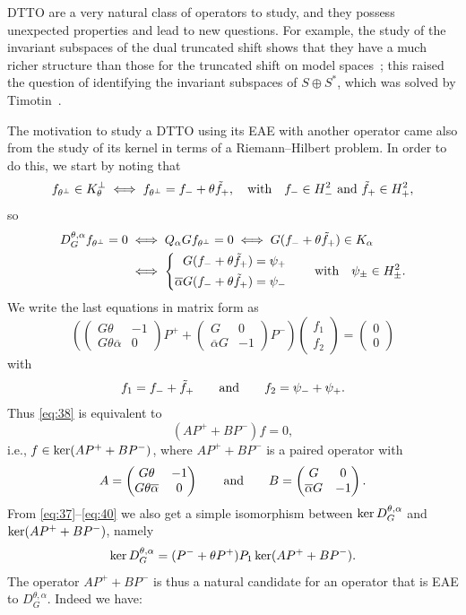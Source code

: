 \documentclass[11pt]{article}
\def\beq{\begin{equation}}
\def\eeq{\end{equation}}
\def\ol{\overline}
\def\til{\tilde}
\def\ker{\mathop{\rm ker}\nolimits}
\begin{document}
DTTO are a very natural class of operators to study, and they possess unexpected properties and lead to new questions. For example, the study of the invariant subspaces of the dual truncated shift shows that they have
a much richer structure than those for the truncated shift on model spaces~\cite{CR21};
this raised the question of identifying the invariant subspaces of $S \oplus S^*$, which was solved by Timotin~\cite{timotin}.

The motivation to study a DTTO using its EAE with another operator came also from the study of 
its kernel in terms of a Riemann--Hilbert problem.
In order to do this, we start by noting that
\[
f_{\theta^\perp} \in K_\theta^\perp \iff f_{\theta^\perp}= f_- + \theta \til f_+, \quad \hbox{with}
\quad f_- \in H^2_- \hbox{ and } \til f_+ \in H^2_+,
\]
so
\begin{align}
D^{\theta,\alpha}_G f_{\theta^\perp}=0 &\iff Q_\alpha G  f_{\theta^\perp} = 0
\iff G(f_- + \theta \til f_+) \in K_\alpha \nonumber \\
& \iff 
\left \{ 
\begin{aligned}
G(f_- + \theta \til f_+)&= \psi_+ \\
\ol\alpha G (f_-+ \theta \til f_+) &= \psi_-
\end{aligned}
\right.
\qquad \hbox{with} \quad \psi_\pm \in H^2_\pm. \label{eq:37}
\end{align}
We write the last equations in matrix form as
\beq\label{eq:38}
\left( \begin{pmatrix} G\theta & -1 \\ G\theta\ol\alpha & 0\end{pmatrix} P^+
+ \begin{pmatrix} G & 0 \\ \ol\alpha G & -1 \end{pmatrix} P^- \right)
\begin{pmatrix} f_1 \\ f_2 \end{pmatrix} = \begin{pmatrix}0 \\ 0 \end{pmatrix}
\eeq
with 
\[ 
f_1 = f_- + \til f_+ \qquad \hbox{and} \qquad f_2= \psi_- + \psi_+.
\]
Thus \eqref{eq:38} is equivalent to
\beq \label{eq:40}
(AP^+ + BP^-)f=0,
\eeq
i.e., $f \in \ker (AP^++BP^-)$, where $AP^++BP^-$
is a paired operator with
\beq\label{eq:25A3aug}
A= \begin{pmatrix} G\theta & -1 \\ G\theta\ol\alpha & 0\end{pmatrix} \qquad \hbox{and}
\qquad B= \begin{pmatrix} G & 0 \\ \ol\alpha G & -1 \end{pmatrix}.
\eeq
From \eqref{eq:37}--\eqref{eq:40} we also get a simple isomorphism between
$\ker D^{\theta,\alpha}_G$ and $\ker(AP^++BP^-)$, namely
\beq\label{eq:25ajun23}
\ker D^{\theta,\alpha}_G = (P^-+\theta P^+) P_1 \ker (AP^++BP^-).
\eeq
The operator $AP^++BP^-$ is thus a natural candidate for an operator that is EAE to $D^{\theta,\alpha}_G$.
Indeed we have:
\end{document}
